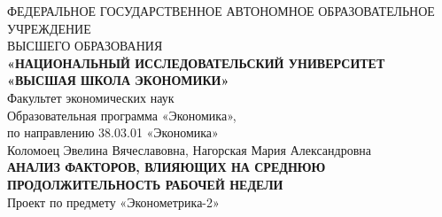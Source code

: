 \documentclass[12pt, a4paper]{article}
\begin{document}
	\begin{center}
		\hfill \break
		\footnotesize{ФЕДЕРАЛЬНОЕ ГОСУДАРСТВЕННОЕ АВТОНОМНОЕ ОБРАЗОВАТЕЛЬНОЕ УЧРЕЖДЕНИЕ}\\ 
		\footnotesize{ВЫСШЕГО ОБРАЗОВАНИЯ}\\
		\small{\textbf{«НАЦИОНАЛЬНЫЙ ИССЛЕДОВАТЕЛЬСКИЙ УНИВЕРСИТЕТ \\ «ВЫСШАЯ ШКОЛА ЭКОНОМИКИ»}}\\
		\hfill \break
		\normalsize{Факультет экономических наук}\\
		\normalsize{Образовательная программа «Экономика»,}\\
		\normalsize{по направлению 38.03.01 «Экономика»}\\
		\hfill \break
		\hfill\break
		\hfill\break
		\hfill \break
		\hfill \break
		\hfill \break
		\hfill \break
		\hfill \break
		\hfill \break
		\hfill \break
		\normalsize{Коломоец Эвелина Вячеславовна, Нагорская Мария Александровна}\\
		\large{\textbf{АНАЛИЗ ФАКТОРОВ, ВЛИЯЮЩИХ НА СРЕДНЮЮ ПРОДОЛЖИТЕЛЬНОСТЬ РАБОЧЕЙ НЕДЕЛИ}}\\
		\hfill \break
		\hfill \break
		\hfill \break
		\normalsize{Проект по предмету «Эконометрика-2»}\\
		\hfill \break
		\hfill \break
	\end{center}
	
	
	
\end{document}
